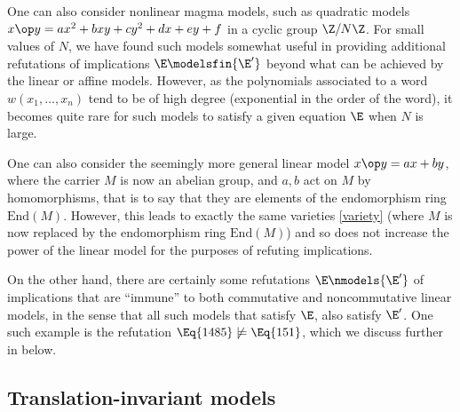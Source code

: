 \begin{remark}  One can also consider nonlinear magma models, such as quadratic models $x \op y = ax^2 + bxy + cy^2 + dx + ey + f$ in a cyclic group $\Z/N\Z$.  For small values of $N$, we have found such models somewhat useful in providing additional refutations of implications $\E \modelsfin {\E'}$ beyond what can be achieved by the linear or affine models.  However, as the polynomials associated to a word $w(x_1,\dots,x_n)$ tend to be of high degree (exponential in the order of the word), it becomes quite rare for such models to satisfy a given equation $\E$ when $N$ is large.
\end{remark}

\begin{remark} One can also consider the seemingly more general linear model $x \op y = ax + by$, where the carrier $M$ is now an abelian group, and $a,b$ act on $M$ by homomorphisms, that is to say that they are elements of the endomorphism ring $\mathrm{End}(M)$.  However, this leads to exactly the same varieties \eqref{variety} (where $M$ is now replaced by the endomorphism ring $\mathrm{End}(M)$) and so does not increase the power of the linear model for the purposes of refuting implications.
\end{remark}

On the other hand, there are certainly some refutations $\E \nmodels {\E'}$ of implications that are ``immune'' to both commutative and noncommutative linear models, in the sense that all such models that satisfy $\E$, also satisfy ${\E'}$.  One such example is the refutation $\Eq{1485} \not \models \Eq{151}$, which we discuss further in  below.

\subsection{Translation-invariant models}\label{translation-sec}

